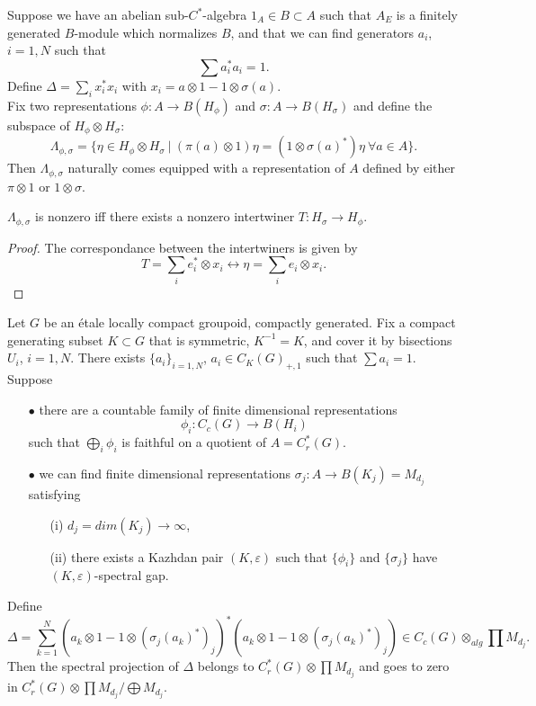 Suppose we have an abelian sub-$C^*$-algebra $1_A \in B\subset A$ such that $A_E$ is a finitely generated $B$-module which normalizes $B$, and that we can find generators $a_i$, $i = 1,N$ such that
\[\sum a_i^* a_i = 1.\]
Define $\Delta = \sum_i x_i^* x_i $ with $x_i =  a \otimes 1 - 1 \otimes \sigma(a)$.\\

Fix two representations $\phi : A \rightarrow B(H_\phi)$ and $\sigma : A \rightarrow B(H_\sigma)$ and define the subspace of $H_\phi \otimes H_\sigma $:
\[\Lambda_{\phi,\sigma} = \{\eta \in H_\phi \otimes H_\sigma \ | \ (\pi(a)\otimes 1)\eta  = (1\otimes \sigma(a)^*) \eta \ \forall a\in A\}.\]
Then $\Lambda_{\phi,\sigma}$ naturally comes equipped with a representation of $A$ defined by either $\pi\otimes 1$ or $1\otimes \sigma$. 
\begin{lem}
$\Lambda_{\phi,\sigma}$ is nonzero iff there exists a nonzero intertwiner $T: H_\sigma \rightarrow H_\phi$.
\end{lem}

\begin{proof}
The correspondance between the intertwiners is given by 
\[ T = \sum_i e_i^*\otimes x_i \longleftrightarrow \eta= \sum_i e_i \otimes x_i.\]  
\end{proof}

Let $G$ be an \'etale locally compact groupoid, compactly generated. Fix a compact generating subset $K\subset G$ that is symmetric, $K^{-1}=K$, and cover it by bisections $U_i$, $i=1,N$. There exists $\{a_i\}_{i=1,N}$, $a_i \in C_K(G)_{+,1}$ such that $\sum a_i = 1$. 
Suppose
\begin{itemize}
\item[$\bullet$] there are a countable family of finite dimensional representations
\[\phi_i : C_c(G)\rightarrow B(H_i)\]
such that $\bigoplus_i \phi_i$ is faithful on a quotient of $A= C^*_r (G)$. 
\item[$\bullet$] we can find finite dimensional representations $\sigma_j : A \rightarrow B(K_j)= M_{d_j}$ satisfying
	\begin{itemize}
	\item[(i)] $d_j= dim(K_j) \rightarrow \infty$,
	\item[(ii)] there exists a Kazhdan pair $(K,\varepsilon)$ such that $\{\phi_i\}$ and $\{\sigma_j\}$ have $(K,\varepsilon)$-spectral gap.
	\end{itemize}
\end{itemize}  
Define
\[\Delta =\sum_{k=1}^N  (a_k \otimes 1 - 1\otimes (\sigma_j(a_k)^*)_j)^*(a_k \otimes 1 - 1\otimes (\sigma_j(a_k)^*)_j) \in C_c(G)\otimes_{alg} \prod M_{d_j}.  \]
Then the spectral projection of $\Delta$ belongs to $C^*_r(G) \otimes \prod M_{d_j}$ and goes to zero in $C^*_r(G) \otimes \prod M_{d_j}/\bigoplus M_{d_j}$.\\

